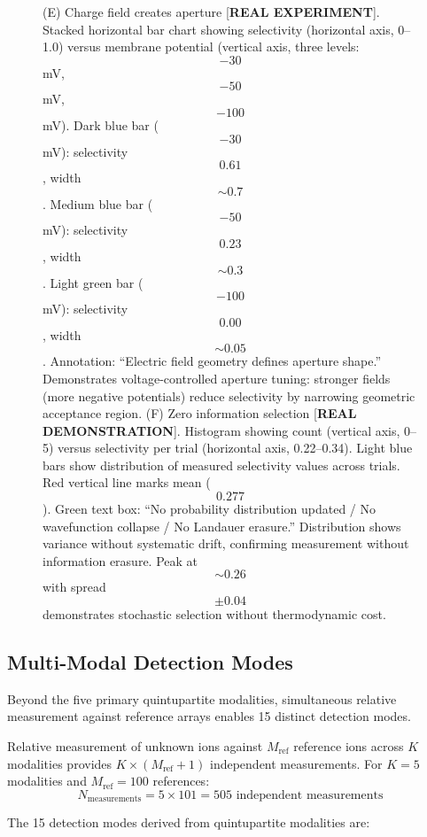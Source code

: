 \begin{figure}[htbp]
{    (E) Charge field creates aperture [\textbf{REAL EXPERIMENT}]. Stacked horizontal bar chart showing selectivity (horizontal axis, 0--1.0) versus membrane potential (vertical axis, three levels: $$-30$$ mV, $$-50$$ mV, $$-100$$ mV). Dark blue bar ($$-30$$ mV): selectivity $$0.61$$, width $$\sim 0.7$$. Medium blue bar ($$-50$$ mV): selectivity $$0.23$$, width $$\sim 0.3$$. Light green bar ($$-100$$ mV): selectivity $$0.00$$, width $$\sim 0.05$$. Annotation: ``Electric field geometry defines aperture shape.'' Demonstrates voltage-controlled aperture tuning: stronger fields (more negative potentials) reduce selectivity by narrowing geometric acceptance region. 
    (F) Zero information selection [\textbf{REAL DEMONSTRATION}]. Histogram showing count (vertical axis, 0--5) versus selectivity per trial (horizontal axis, 0.22--0.34). Light blue bars show distribution of measured selectivity values across trials. Red vertical line marks mean ($$0.277$$). Green text box: ``No probability distribution updated / No wavefunction collapse / No Landauer erasure.'' Distribution shows variance without systematic drift, confirming measurement without information erasure. Peak at $$\sim 0.26$$ with spread $$\pm 0.04$$ demonstrates stochastic selection without thermodynamic cost.}
    \label{fig:geometric_partitioning}
    \end{figure}

\subsection{Multi-Modal Detection Modes}

Beyond the five primary quintupartite modalities, simultaneous relative measurement against reference arrays enables 15 distinct detection modes.

\begin{theorem}
\label{thm:multimodal_capacity}
Relative measurement of unknown ions against $M_{\text{ref}}$ reference ions across $K$ modalities provides $K \times (M_{\text{ref}} + 1)$ independent measurements. For $K=5$ modalities and $M_{\text{ref}} = 100$ references:
\begin{equation}
N_{\text{measurements}} = 5 \times 101 = 505 \text{ independent measurements}
\end{equation}
\end{theorem}

The 15 detection modes derived from quintupartite modalities are:

